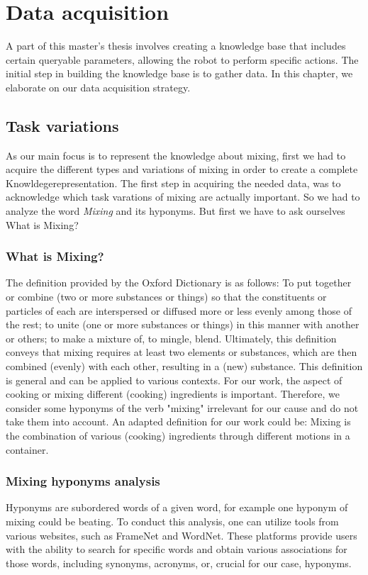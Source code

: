 \chapter*{Data acquisition}
A part of this master's thesis involves creating a knowledge base that includes certain queryable parameters, allowing the robot to perform specific actions. The initial step in building the knowledge base is to gather data. In this chapter, we elaborate on our data acquisition strategy.
\section*{Task variations}
	As our main focus is to represent the knowledge about mixing, first we had to acquire the different types and variations of mixing in order to create a complete Knowldegerepresentation. The first step in acquiring the needed data, was to acknowledge which task varations of mixing are actually important. 
  So we had to analyze the word \textit{Mixing} and its hyponyms. But first we have to ask ourselves What is Mixing?
  \subsection*{What is Mixing?}
  The definition provided by the Oxford Dictionary is as follows: To put together or combine (two or more substances or things) so that the constituents or particles of each are interspersed or diffused more or less evenly among those of the rest; to unite (one or more substances or things) in this manner with another or others; to make a mixture of, to mingle, blend.
  Ultimately, this definition conveys that mixing requires at least two elements or substances, which are then combined (evenly) with each other, resulting in a (new) substance.
  This definition is general and can be applied to various contexts. For our work, the aspect of cooking or mixing different (cooking) ingredients is important. Therefore, we consider some hyponyms of the verb "mixing" irrelevant for our cause and do not take them into account.
  An adapted definition for our work could be: Mixing is the combination of various (cooking) ingredients through different motions in a container.
  
  \subsection*{Mixing hyponyms analysis} 
	Hyponyms are subordered words of a given word, for example one hyponym of mixing could be beating. 
  To conduct this analysis, one can utilize tools from various websites, such as FrameNet and WordNet. These platforms provide users with the ability to search for specific words and obtain various associations for those words, including synonyms, acronyms, or, crucial for our case, hyponyms.	
